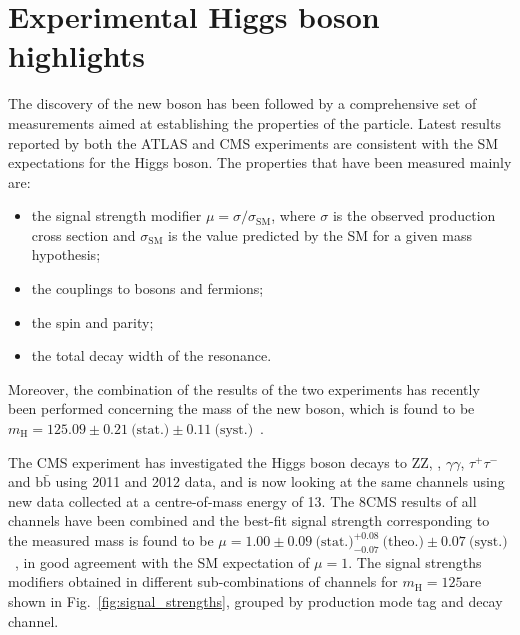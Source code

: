 \section{Experimental Higgs boson highlights}
\label{sec:HiggsExp}

The discovery of the new boson has been followed by a comprehensive set of measurements aimed at establishing the properties of the particle. Latest results reported by both the ATLAS and CMS experiments are consistent with the SM expectations for the Higgs boson. The properties that have been measured mainly are:

\begin{itemize}
\item the signal strength modifier $\mu = \sigma/\sigma_\mathrm{SM}$, where $\sigma$ is the observed production cross section and $\sigma_\mathrm{SM}$ is the value predicted by the SM for a given mass hypothesis;

\item the couplings to bosons and fermions;

\item the spin and parity;

\item the total decay width of the resonance.
\end{itemize}

Moreover, the combination of the results of the two experiments has recently been performed concerning the mass of the new boson, which is found to be $m_\mathrm{H} = 125.09 \pm 0.21 ~\text{(stat.)} \pm 0.11~\text{(syst.)}$\GeV~\cite{Aad:2015zhl}.

The CMS experiment has investigated the Higgs boson decays to ZZ, \WW, $\gamma\gamma$, $\tau^+\tau^-$ and $\mathrm{b \bar b}$ using 2011 and 2012 data, and is now looking at the same channels using new data collected at a centre-of-mass energy of 13\TeV. The 8\TeV CMS results of all channels have been combined and the best-fit signal strength corresponding to the measured mass is found to be $\mu = 1.00 \pm 0.09~\text{(stat.)} ^{+0.08}_{-0.07}~\text{(theo.)} \pm  0.07~\text{(syst.)}$~\cite{Khachatryan:2014jba}, in good agreement with the SM expectation of $\mu=1$.
The signal strengths modifiers obtained in different sub-combinations of channels for $m_\mathrm{H}=125$\GeV are shown in Fig.~\ref{fig:signal_strengths}, grouped by production mode tag and decay channel.

